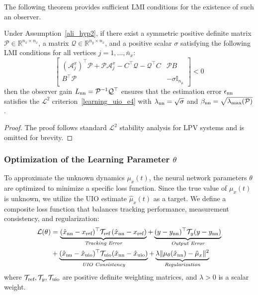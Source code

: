 The following theorem provides sufficient LMI conditions for the existence of such an observer.

\begin{theorem}\label{ali_thm2}
Under Assumption~\ref{ali_hyp2}, if there exist a symmetric positive definite matrix $\mathcal{P} \in \mathbb{R}^{n_{x}\times n_{x}}$, a matrix $\mathcal{Q} \in \mathbb{R}^{n_{y}\times n_{x}}$, and a positive scalar $\sigma$ satisfying the following LMI conditions for all vertices $j=1,\dots,\bar{n}_x$:
\begin{equation}\label{ali_LMI_2}
\begin{bmatrix}
\left(\mathcal{A}^{x}_{j}\right)^{\top} \mathcal{P} + \mathcal{P} \mathcal{A}^{x}_{j}  - C^{\top} \mathcal{Q}  - \mathcal{Q}^{\top}  C
&
\mathcal{P} B
\\
B^{\top} \mathcal{P} &
- \sigma \mathbb{I}_{n_{\mu}}
\end{bmatrix} 
< 0
\end{equation}
then the observer gain $L_{\text{nn}} = \mathcal{P}^{-1} \mathcal{Q}^{\top}$ ensures that the estimation error $\epsilon_{\text{nn}}$ satisfies the $\mathcal{L}^{2}$ criterion~\eqref{learning_uio_e4} with $\lambda_{\text{nn}}=\sqrt{\sigma}$ and $\beta_{\text{nn}} = \sqrt{\lambda_{\max} (\mathcal{P})}$.
\end{theorem}
\begin{proof}
The proof follows standard $\mathcal{L}^{2}$ stability analysis for LPV systems and is omitted for brevity.
\end{proof}

\subsubsection{Optimization of the Learning Parameter $\theta$}
To approximate the unknown dynamics $\mu_{x}(t)$, the neural network parameters $\theta$ are optimized to minimize a specific loss function. Since the true value of $\mu_{x}(t)$ is unknown, we utilize the UIO estimate $\hat{\mu}_{x}(t)$ as a target. We define a composite loss function that balances tracking performance, measurement consistency, and regularization:
{\small
\begin{align}\label{loss_fun}
\mathcal{L}(\theta) &= \underbrace{(\hat{x}_{\text{nn}} - x_{\text{ref}})^{\top} \mathcal{T}_{\text{ref}}\,(\hat{x}_{\text{nn}} - x_{\text{ref}})}_{\textit{Tracking Error}} 
+ 
\underbrace{(y - y_{\text{nn}})^{\top} \mathcal{T}_{y} (y - y_{\text{nn}})}_{\textit{Output Error}} \notag \\
&+ \underbrace{(\hat{x}_{\text{nn}} - \hat{x}_{\text{uio}})^{\top} \mathcal{T}_{\text{uio}} (\hat{x}_{\text{nn}} - \hat{x}_{\text{uio}})}_{\textit{UIO Consistency}} 
+ 
\underbrace{\lambda \| \mu_{\theta}(\hat{x}_{\text{nn}}) - \hat{\mu}_{x} \|^2}_{\textit{Regularization}}   
\end{align}
}
where $\mathcal{T}_{\text{ref}}, \mathcal{T}_{y}, \mathcal{T}_{\text{uio}}$ are positive definite weighting matrices, and $\lambda > 0$ is a scalar weight.

